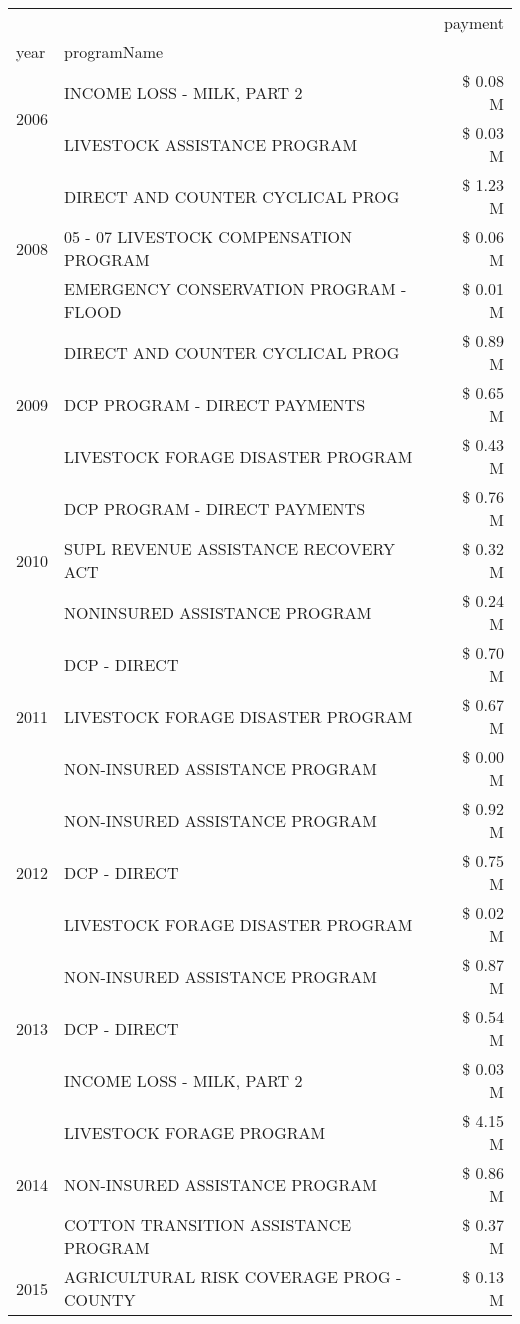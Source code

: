 \begin{tabular}{llr}
\toprule
 &  & payment \\
year & programName &  \\
\midrule
\multirow[t]{2}{*}{2006} & INCOME LOSS - MILK, PART 2 & \$ 0.08 M \\
 & LIVESTOCK ASSISTANCE PROGRAM & \$ 0.03 M \\
\cline{1-3}
\multirow[t]{3}{*}{2008} & DIRECT AND COUNTER CYCLICAL PROG & \$ 1.23 M \\
 & 05 - 07 LIVESTOCK COMPENSATION PROGRAM & \$ 0.06 M \\
 & EMERGENCY CONSERVATION PROGRAM - FLOOD & \$ 0.01 M \\
\cline{1-3}
\multirow[t]{3}{*}{2009} & DIRECT AND COUNTER CYCLICAL PROG & \$ 0.89 M \\
 & DCP PROGRAM - DIRECT PAYMENTS & \$ 0.65 M \\
 & LIVESTOCK FORAGE DISASTER  PROGRAM & \$ 0.43 M \\
\cline{1-3}
\multirow[t]{3}{*}{2010} & DCP PROGRAM - DIRECT PAYMENTS & \$ 0.76 M \\
 & SUPL REVENUE ASSISTANCE RECOVERY ACT & \$ 0.32 M \\
 & NONINSURED ASSISTANCE PROGRAM & \$ 0.24 M \\
\cline{1-3}
\multirow[t]{3}{*}{2011} & DCP - DIRECT & \$ 0.70 M \\
 & LIVESTOCK FORAGE DISASTER PROGRAM & \$ 0.67 M \\
 & NON-INSURED ASSISTANCE PROGRAM & \$ 0.00 M \\
\cline{1-3}
\multirow[t]{3}{*}{2012} & NON-INSURED ASSISTANCE PROGRAM & \$ 0.92 M \\
 & DCP - DIRECT & \$ 0.75 M \\
 & LIVESTOCK FORAGE DISASTER PROGRAM & \$ 0.02 M \\
\cline{1-3}
\multirow[t]{3}{*}{2013} & NON-INSURED ASSISTANCE PROGRAM & \$ 0.87 M \\
 & DCP - DIRECT & \$ 0.54 M \\
 & INCOME LOSS - MILK, PART 2 & \$ 0.03 M \\
\cline{1-3}
\multirow[t]{3}{*}{2014} & LIVESTOCK FORAGE PROGRAM & \$ 4.15 M \\
 & NON-INSURED ASSISTANCE PROGRAM & \$ 0.86 M \\
 & COTTON TRANSITION ASSISTANCE PROGRAM & \$ 0.37 M \\
\cline{1-3}
\multirow[t]{2}{*}{2015} & AGRICULTURAL RISK COVERAGE PROG - COUNTY & \$ 0.13 M \\

\end{tabular}
